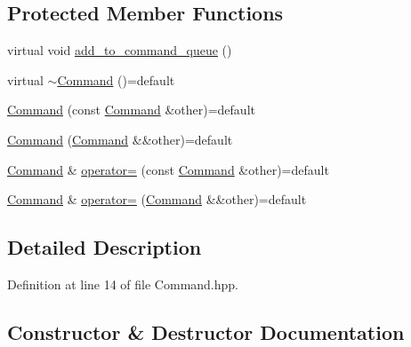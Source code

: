 \subsection*{Protected Member Functions}
\begin{DoxyCompactItemize}
\item 
virtual void \hyperlink{classmt_1_1_command_a2c5624d20b5fe630cb6321b071911be2_a2c5624d20b5fe630cb6321b071911be2}{add\+\_\+to\+\_\+command\+\_\+queue} ()
\item 
virtual \hyperlink{classmt_1_1_command_a69478fe27bf054dcc58e1e3252c7e036_a69478fe27bf054dcc58e1e3252c7e036}{$\sim$\+Command} ()=default
\item 
\hyperlink{classmt_1_1_command_a8e147430331c4874e8b69e059207b3c7_a8e147430331c4874e8b69e059207b3c7}{Command} (const \hyperlink{classmt_1_1_command}{Command} \&other)=default
\item 
\hyperlink{classmt_1_1_command_a569138eb8252b012d1f7a5afdb09f9f9_a569138eb8252b012d1f7a5afdb09f9f9}{Command} (\hyperlink{classmt_1_1_command}{Command} \&\&other)=default
\item 
\hyperlink{classmt_1_1_command}{Command} \& \hyperlink{classmt_1_1_command_af569356c751694a788e0c054db53a1b4_af569356c751694a788e0c054db53a1b4}{operator=} (const \hyperlink{classmt_1_1_command}{Command} \&other)=default
\item 
\hyperlink{classmt_1_1_command}{Command} \& \hyperlink{classmt_1_1_command_a806a91759fce733298a55eea319294db_a806a91759fce733298a55eea319294db}{operator=} (\hyperlink{classmt_1_1_command}{Command} \&\&other)=default
\end{DoxyCompactItemize}


\subsection{Detailed Description}


Definition at line 14 of file Command.\+hpp.



\subsection{Constructor \& Destructor Documentation}
